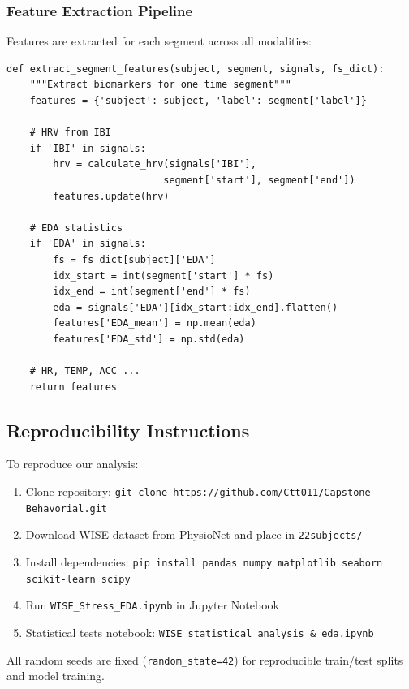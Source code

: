 \documentclass[12pt,letterpaper]{article}
\begin{document}
\subsubsection{Feature Extraction Pipeline}

Features are extracted for each segment across all modalities:

\begin{verbatim}
def extract_segment_features(subject, segment, signals, fs_dict):
    """Extract biomarkers for one time segment"""
    features = {'subject': subject, 'label': segment['label']}

    # HRV from IBI
    if 'IBI' in signals:
        hrv = calculate_hrv(signals['IBI'],
                           segment['start'], segment['end'])
        features.update(hrv)

    # EDA statistics
    if 'EDA' in signals:
        fs = fs_dict[subject]['EDA']
        idx_start = int(segment['start'] * fs)
        idx_end = int(segment['end'] * fs)
        eda = signals['EDA'][idx_start:idx_end].flatten()
        features['EDA_mean'] = np.mean(eda)
        features['EDA_std'] = np.std(eda)

    # HR, TEMP, ACC ...
    return features
\end{verbatim}

\subsection{Reproducibility Instructions}

To reproduce our analysis:

\begin{enumerate}
    \item Clone repository: \texttt{git clone https://github.com/Ctt011/Capstone-Behavorial.git}
    \item Download WISE dataset from PhysioNet and place in \texttt{22subjects/}
    \item Install dependencies: \texttt{pip install pandas numpy matplotlib seaborn scikit-learn scipy}
    \item Run \texttt{WISE\_Stress\_EDA.ipynb} in Jupyter Notebook
    \item Statistical tests notebook: \texttt{WISE statistical analysis \& eda.ipynb}
\end{enumerate}

All random seeds are fixed (\texttt{random\_state=42}) for reproducible train/test splits and model training.
\end{document}
